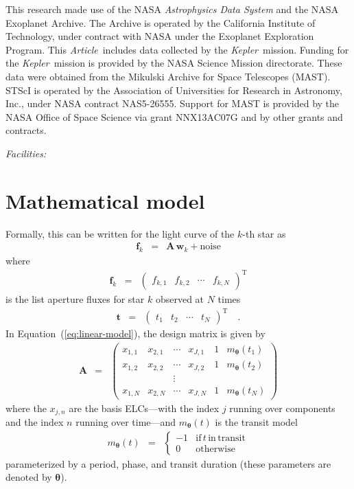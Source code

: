 \documentclass[12pt,preprint]{aastex}
\newcommand{\project}[1]{\textsl{#1}} %
\newcommand{\kepler}{\project{Kepler}}
\newcommand{\paper}{\textsl{Article}}
\newcommand{\Eq}[1]{Equation~(\ref{eq:#1})}
\newcommand{\eq}[1]{\Eq{#1}}
\newcommand{\eqlabel}[1]{\label{eq:#1}}
\newcommand{\sectlabel}[1]{\label{sect:#1}}
\newcommand{\T}{\ensuremath{\mathrm{T}}}
\newcommand{\bvec}[1]{{\ensuremath{\boldsymbol{#1}}}}
\begin{document}
This research made use of the NASA \project{Astrophysics Data System} and the
NASA Exoplanet Archive.
The Archive is operated by the California Institute of Technology, under
contract with NASA under the Exoplanet Exploration Program.
This \paper\ includes data collected by the \kepler\ mission. Funding for the
\kepler\ mission is provided by the NASA Science Mission directorate.
These data were obtained from the Mikulski Archive for Space Telescopes
(MAST).
STScI is operated by the Association of Universities for Research in
Astronomy, Inc., under NASA contract NAS5-26555.
Support for MAST is provided by the NASA Office of Space Science via grant
NNX13AC07G and by other grants and contracts.

{\it Facilities:} 

\appendix

\section{Mathematical model}
\sectlabel{math}

Formally, this can be written for the light curve of the $k$-th star as
\begin{eqnarray}\eqlabel{linear-model}
\bvec{f}_k &=& \bvec{A}\,\bvec{w}_k + \mathrm{noise}
\end{eqnarray}
where
\begin{eqnarray}
\bvec{f}_k &=& \left (\begin{array}{cccc}
    f_{k,1} & f_{k,2} & \cdots & f_{k,N}
\end{array}\right )^\T
\end{eqnarray}
is the list aperture fluxes for star $k$ observed at $N$ times
\begin{eqnarray}
\bvec{t} &=& \left (\begin{array}{cccc}
    t_{1} & t_{2} & \cdots & t_{N}
\end{array}\right )^\T \quad.
\end{eqnarray}
In \eq{linear-model}, the design matrix is given by
\begin{eqnarray}
\bvec{A} &=& \left (\begin{array}{cccccc}
    x_{1,1} & x_{2,1} & \cdots & x_{J,1} & 1 & m_\bvec{\theta}(t_1) \\
    x_{1,2} & x_{2,2} & \cdots & x_{J,2} & 1 & m_\bvec{\theta}(t_2) \\
    && \vdots &&&\\
    x_{1,N} & x_{2,N} & \cdots & x_{J,N} & 1 & m_\bvec{\theta}(t_N)
\end{array}\right )
\end{eqnarray}
where the $x_{j,n}$ are the basis ELCs---with the index $j$ running over
components and the index $n$ running over time---and $m_\bvec{\theta}(t)$ is
the transit model
\begin{eqnarray}
m_\bvec{\theta}(t) &=& \left\{\begin{array}{cl}
-1 & \mathrm{if\,}t\,\mathrm{in\,transit} \\
0 & \mathrm{otherwise}
\end{array}\right.
\end{eqnarray}
parameterized by a period, phase, and transit duration (these parameters are
denoted by \bvec{\theta}).
\end{document}

